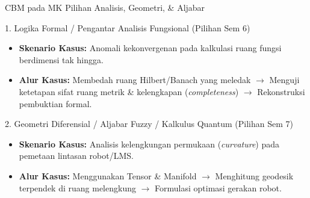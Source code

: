 \documentclass[aspectratio=169]{beamer} %
\begin{document}
\begin{frame}{CBM pada MK Pilihan Analisis, Geometri, \& Aljabar}
    \begin{block}{1. Logika Formal / Pengantar Analisis Fungsional (Pilihan Sem 6)}
        \begin{itemize}
            \item \textbf{Skenario Kasus:} Anomali kekonvergenan pada kalkulasi ruang fungsi berdimensi tak hingga.
            \item \textbf{Alur Kasus:} Membedah ruang Hilbert/Banach yang meledak $\rightarrow$ Menguji ketetapan sifat ruang metrik \& kelengkapan (\textit{completeness}) $\rightarrow$ Rekonstruksi pembuktian formal.
        \end{itemize}
    \end{block}

    \begin{block}{2. Geometri Diferensial / Aljabar Fuzzy / Kalkulus Quantum (Pilihan Sem 7)}
        \begin{itemize}
            \item \textbf{Skenario Kasus:} Analisis kelengkungan permukaan (\textit{curvature}) pada pemetaan lintasan robot/LMS.
            \item \textbf{Alur Kasus:} Menggunakan Tensor \& Manifold $\rightarrow$ Menghitung geodesik terpendek di ruang melengkung $\rightarrow$ Formulasi optimasi gerakan robot.
        \end{itemize}
    \end{block}
\end{frame}
\end{document}
